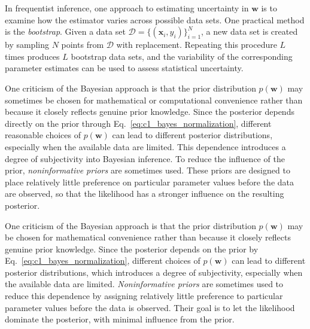 \documentclass[10pt,twocolumn]{memoir}
\begin{document}
In frequentist inference, one approach to estimating uncertainty in $\mathbf{w}$ is to examine how the estimator varies across possible data sets. One practical method is the \textit{bootstrap}. Given a data set $\mathcal{D}=\{(\mathbf{x}_i,y_i)\}^N_{i=1}$, a new data set is created by sampling $N$ points from $\mathcal{D}$ with replacement. Repeating this procedure $L$ times produces $L$ bootstrap data sets, and the variability of the corresponding parameter estimates can be used to assess statistical uncertainty.

One criticism of the Bayesian approach is that the prior distribution $p(\mathbf{w})$ may sometimes be chosen for mathematical or computational convenience rather than because it closely reflects genuine prior knowledge. Since the posterior depends directly on the prior through Eq.~\ref{eq:c1_bayes_normalization}, different reasonable choices of $p(\mathbf{w})$ can lead to different posterior distributions, especially when the available data are limited. This dependence introduces a degree of subjectivity into Bayesian inference. To reduce the influence of the prior, \textit{noninformative priors} are sometimes used. These priors are designed to place relatively little preference on particular parameter values before the data are observed, so that the likelihood has a stronger influence on the resulting posterior.

One criticism of the Bayesian approach is that the prior distribution $p(\mathbf{w})$ may be chosen for mathematical convenience rather than because it closely reflects genuine prior knowledge. Since the posterior depends on the prior by Eq.~\ref{eq:c1_bayes_normalization}, different choices of $p(\mathbf{w})$ can lead to different posterior distributions, which introduces a degree of subjectivity, especially when the available data are limited. \textit{Noninformative priors} are sometimes used to reduce this dependence by assigning relatively little preference to particular parameter values before the data is observed. Their goal is to let the likelihood dominate the posterior, with minimal influence from the prior.
\end{document}

